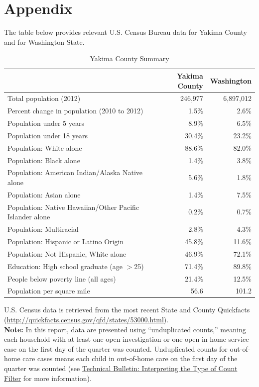 \documentclass{article}\usepackage[]{graphicx}\usepackage[]{color}
\begin{document}
\vspace{-18pt}

\newpage

\section{Appendix}

The table below provides relevant U.S. Census Bureau data for Yakima County and for Washington State. 
\nopagebreak[3]
\begin{table}[ht]
\centering
\caption{Yakima County Summary} 
\begin{tabular}{lrr}
  \toprule
 & Yakima County & Washington \\ 
  \midrule
Total population (2012) & 246,977 & 6,897,012 \\ 
  Percent change in population (2010 to 2012) & 1.5\% & 2.6\% \\ 
  Population under 5 years & 8.9\% & 6.5\% \\ 
  Population under 18 years & 30.4\% & 23.2\% \\ 
  Population: White alone & 88.6\% & 82.0\% \\ 
  Population: Black alone & 1.4\% & 3.8\% \\ 
  Population: American Indian/Alaska Native alone & 5.6\% & 1.8\% \\ 
  Population: Asian alone & 1.4\% & 7.5\% \\ 
  Population: Native Hawaiian/Other Pacific Islander alone & 0.2\% & 0.7\% \\ 
  Population: Multiracial & 2.8\% & 4.3\% \\ 
  Population: Hispanic or Latino Origin & 45.8\% & 11.6\% \\ 
  Population: Not Hispanic, White alone & 46.9\% & 72.1\% \\ 
  Education: High school graduate (age $>$25) & 71.4\% & 89.8\% \\ 
  People below poverty line (all ages) & 21.4\% & 12.5\% \\ 
  Population per square mile & 56.6 & 101.2 \\ 
   \bottomrule
\end{tabular}
\end{table}



U.S. Census data is retrieved from the most recent State and County Quickfacts (\href{http://quickfacts.census.gov/qfd/states/53000.html}{http://quickfacts.census.gov/qfd/states/53000.html}).\\

\textbf{Note:} In this report, data are presented using ``unduplicated counts,'' meaning each household with at least one open investigation or one open in-home service case on the first day of the quarter was counted. Unduplicated counts for out-of-home care cases means each child in out-of-home care on the first day of the quarter was counted (see \href{http://http://www.partnersforourchildren.org/publications/using-different-count-types-data-portal}{Technical Bulletin: Interpreting the Type of Count Filter} for more information).  
\end{document}
